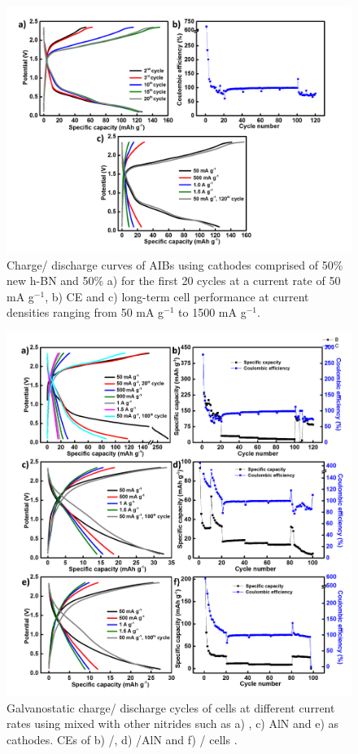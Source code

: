 \begin{figure}[tbh!]
\centering
\includegraphics[width=\textwidth]{Figures/BOhBN/hBNBO5050}
\caption{Charge/ discharge curves of AIBs using cathodes comprised of 50\% new h-BN and 50\%  a) for the first 20 cycles at a current rate of 50 mA g$^{-1}$, b) CE and c) long-term cell performance at current densities ranging from 50 mA g$^{-1}$ to 1500 mA g$^{-1}$.}
\label{Figures/BOhBN:hBNBO5050}
\end{figure}

\begin{figure}[tbh!]
\centering
\includegraphics[width=\textwidth]{Figures/BOhBN/Bonit}
\caption{Galvanostatic charge/ discharge cycles of cells at different current rates using  mixed with other nitrides such as a) , c) AlN and e)  as cathodes. CEs of b) /, d) /AlN and f) / cells .}
\label{Figures/BOhBN:Bonit}
\end{figure}

